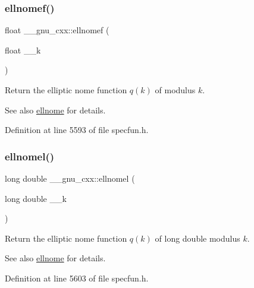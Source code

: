 \subsubsection{\texorpdfstring{ellnomef()}{ellnomef()}}
{\footnotesize\ttfamily float \+\_\+\+\_\+gnu\+\_\+cxx\+::ellnomef (\begin{DoxyParamCaption}\item[{float}]{\+\_\+\+\_\+k }\end{DoxyParamCaption})\hspace{0.3cm}{\ttfamily [inline]}}

Return the elliptic nome function $ q(k) $ of modulus $ k $.

\begin{DoxySeeAlso}{See also}
\hyperlink{group__gnu__math__spec__func_ga7bfb34f8b5c0ed7c72040f9cb7034bba}{ellnome} for details. 
\end{DoxySeeAlso}


Definition at line 5593 of file specfun.\+h.

\mbox{\label{group__gnu__math__spec__func_ga0774570b24f654f8ae39e1865613a4e2}} 
\subsubsection{\texorpdfstring{ellnomel()}{ellnomel()}}
{\footnotesize\ttfamily long double \+\_\+\+\_\+gnu\+\_\+cxx\+::ellnomel (\begin{DoxyParamCaption}\item[{long double}]{\+\_\+\+\_\+k }\end{DoxyParamCaption})\hspace{0.3cm}{\ttfamily [inline]}}

Return the elliptic nome function $ q(k) $ of {\ttfamily long double} modulus $ k $.

\begin{DoxySeeAlso}{See also}
\hyperlink{group__gnu__math__spec__func_ga7bfb34f8b5c0ed7c72040f9cb7034bba}{ellnome} for details. 
\end{DoxySeeAlso}


Definition at line 5603 of file specfun.\+h.

\mbox{\label{group__gnu__math__spec__func_gac956e6457ab7d0d1765d281e73073f55}} 
